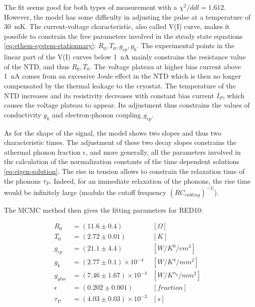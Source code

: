 The fit seems good for both types of measurement with a $\chi^2/ddl=1.612$. However, the model has some difficulty in adjusting the pulse at a temperature of \SI{30}{\milli\kelvin}. The current-voltage characteristic, also called V(I) curve, makes it possible to constrain the free parameters involved in the steady state equations \ref{eq:ethem-system-stationnary}: $R_0, T_0, g_{ep}, g_k$. The experimental points in the linear part of the V(I) curves below \SI{1}{\nano\ampere} mainly constrains the resistance value of the NTD, and thus $R_0, T_0$. The voltage plateau at higher bias current above \SI{1}{\nano\ampere} comes from an excessive Joule effect in the NTD which is then no longer compensated by the thermal leakage to the cryostat. The temperature of the NTD increases and its resistivity decreases with constant bias current $I_P$, which causes the voltage plateau to appear. Its adjustment thus constrains the values of conductivity $g_k$ and electron-phonon coupling $g_{ep}$.

As for the shape of the signal, the model shows two slopes and thus two characteristic times. The adjustment of these two decay slopes constrains the athermal phonon fraction $\epsilon$, and more generally, all the parameters involved in the calculation of the normalization constants of the time dependent solutions \ref{eq:eigen-solution}.
The rise in tension allows to constrain the relaxation time of the phonons $\tau_P$. Indeed, for an immediate relaxation of the phonons, the rise time would be infinitely large (modulo the cutoff frequency $(RC_{cabling})^{-1]}$).

The MCMC method then gives the fitting parameters for RED10:

\begin{align}
R_0 &= (11.6 \pm 0.4)&[\Omega] \\
T_0 &= (2.72 \pm 0.01) &[K] \\
g_{ep} &= (21.1 \pm 4.4) &[W/K^6/cm^3] \\
g_k &= (2.77 \pm 0.1) \times 10^{-4}&[W/K^4/mm^2] \\
g_{glue} &= (7.46 \pm 1.67) \times 10^{-4} &[W/K^{n_g}/mm^2] \\
\epsilon &= (0.202 \pm 0.001)  & [fraction]\\
\tau_P &= (4.03 \pm 0.03) \times 10^{-3} &[s]
\end{align}

